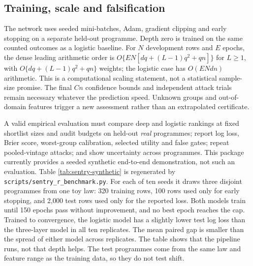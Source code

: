\subsection{Training, scale and falsification}

The network uses seeded mini-batches, Adam, gradient clipping and early
stopping on a separate held-out programme. Depth zero is trained on the same
counted outcomes as a logistic baseline. For $N$ development rows and $E$
epochs, the dense leading arithmetic order is
$O\{EN[dq+(L-1)q^2+qn]\}$ for $L\geq1$, with
$O\{dq+(L-1)q^2+qn\}$ weights; the logistic case has $O(ENdn)$
arithmetic. This is a computational scaling statement, not a statistical
sample-size promise. The final $Cn$ confidence bounds and independent attack
trials remain necessary whatever the prediction speed. Unknown groups and
out-of-domain features trigger a new assessment rather than an extrapolated
certificate.

A valid empirical evaluation must compare deep and logistic rankings at fixed
shortlist sizes and audit budgets on held-out \emph{real} programmes; report
log loss, Brier score, worst-group calibration, selected utility and false
gates; repeat pooled-vintage attacks; and show uncertainty across programmes.
This package currently provides a seeded synthetic end-to-end demonstration,
not such an evaluation. Table \ref{tab:sentry-synthetic} is regenerated by
\texttt{scripts/sentry\_r\_benchmark.py}. For each of ten seeds it draws
three disjoint programmes from one toy law: 320 training rows, 100 rows used
only for early stopping, and 2,000 test rows used only for the reported loss.
Both models train until 150 epochs pass without improvement, and no best
epoch reaches the cap. Trained to convergence, the logistic model has a
slightly lower test log loss than the three-layer model in all ten
replicates. The mean paired gap is smaller than the spread of either model
across replicates. The table shows that the pipeline runs, not that depth
helps. The test programmes come from the same law and feature range as the
training data, so they do not test shift.

